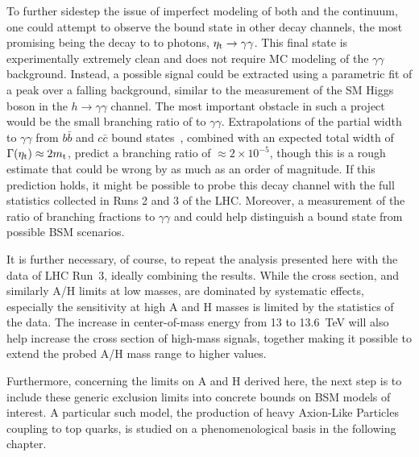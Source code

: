 To further sidestep the issue of imperfect modeling of both \etat and the \ttbar continuum, one could attempt to observe the \ttbar bound state in other decay channels, the most promising being the decay to to photons, $\mathrm{\eta_t} \rightarrow \gamma\gamma$. This final state is experimentally extremely clean and does not require MC modeling of the $\gamma\gamma$ background. Instead, a possible signal could be extracted using a parametric fit of a peak over a falling background, similar to the measurement of the SM Higgs boson in the $h \rightarrow \gamma\gamma$ channel. The most important obstacle in such a project would be the small branching ratio of \etat to $\gamma\gamma$. Extrapolations of the partial width to $\gamma\gamma$ from $b\bar{b}$ and $c\bar{c}$ bound states~\cite{Jiang:2024fyw}, combined with an expected total width of $\Gamma(\mathrm{\eta_t}) \approx 2 m_{\mathrm{t}}$, predict a branching ratio of $\approx 2 \times 10^{-5}$, though this is a rough estimate that could be wrong by as much as an order of magnitude. If this prediction holds, it might be possible to probe this decay channel with the full statistics collected in Runs 2 and 3 of the LHC. Moreover, a measurement of the ratio of branching fractions to $\gamma\gamma$ and \ttbar could help distinguish a bound state from possible BSM scenarios.


It is further necessary, of course, to repeat the analysis presented here with the data of LHC Run~3, ideally combining the results. While the \etat cross section, and similarly A/H limits at low masses, are dominated by systematic effects, especially the sensitivity at high A and H masses is limited by the statistics of the data. The increase in center-of-mass energy from 13 to \SI{13.6}{\TeV} will also help increase the cross section of high-mass signals, together making it possible to extend the probed A/H mass range to higher values.

Furthermore, concerning the limits on A and H derived here, the next step is to include these generic exclusion limits into concrete bounds on BSM models of interest. A particular such model, the production of heavy Axion-Like Particles coupling to top quarks, is studied on a phenomenological basis in the following chapter.


